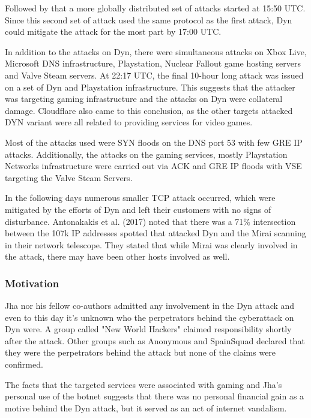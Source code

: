 Followed by that a more globally distributed set of attacks started at 15:50 UTC. Since this second set of attack used the same protocol as the first attack, Dyn could mitigate the attack for the most part by 17:00 UTC. \cite{Dyn16}
 
In addition to the attacks on Dyn, there were simultaneous attacks on Xbox Live, Microsoft DNS infrastructure, Playstation, Nuclear Fallout game hosting servers and Valve Steam servers. At 22:17 UTC, the final 10-hour long attack was issued on a set of Dyn and Playstation infrastructure. \cite{Antonakakis17}
This suggests that the attacker was targeting gaming infrastructure and the attacks on Dyn were collateral damage. Cloudflare also came to this conclusion, as the other targets attacked DYN variant were all related to providing services for video games. \cite{Cloudflare17}

Most of the attacks used were SYN floods on the DNS port 53 with few GRE IP attacks. Additionally, the attacks on the gaming services, mostly Playstation Networks infrastructure were carried out via ACK and GRE IP floods with VSE targeting the Valve Steam Servers. \cite{Antonakakis17}

In the following days numerous smaller TCP attack occurred, which were mitigated by the efforts of Dyn and left their customers with no signs of disturbance. \cite{Dyn16} Antonakakis et al. (2017) noted that there was a 71\% intersection between the 107k IP addresses spotted that attacked Dyn and the Mirai scanning in their network telescope. They stated that while Mirai was clearly involved in the attack, there may have been other hosts involved as well. \cite{Antonakakis17}

		\subsubsection{Motivation}
Jha nor his fellow co-authors admitted any involvement in the Dyn attack and even to this day it's unknown who the perpetrators behind the cyberattack on Dyn were. A group called "New World Hackers" claimed responsibility shortly after the attack. Other groups such as Anonymous and SpainSquad declared that they were the perpetrators behind the attack but none of the claims were confirmed. \cite{Lewis17}

The facts that the targeted services were associated with gaming and Jha's personal use of the botnet suggests that there was no personal financial gain as a motive behind the Dyn attack, but it served as an act of internet vandalism.

